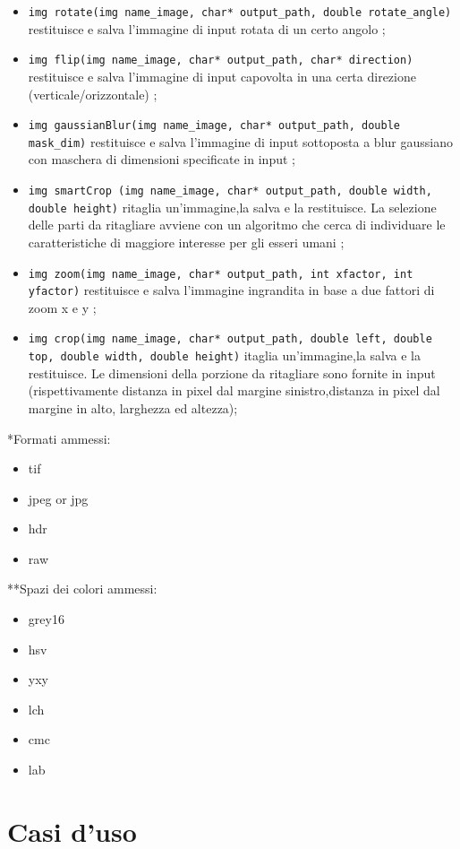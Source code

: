 \documentclass[10pt]{article}
\begin{document}
\begin{itemize}
\item \texttt{img rotate(img name\_image, char* output\_path, double rotate\_angle)} restituisce e salva l’immagine di input rotata di un certo angolo ;
\item \texttt{img flip(img name\_image, char* output\_path, char* direction)} restituisce e salva l’immagine di input capovolta in una certa direzione (verticale/orizzontale) ;
\item \texttt{img gaussianBlur(img name\_image, char* output\_path, double mask\_dim)} restituisce e salva l’immagine di input sottoposta a blur gaussiano con maschera di dimensioni specificate in input ;
\item \texttt{img smartCrop (img name\_image, char* output\_path, double width, double height)} ritaglia un’immagine,la salva e la restituisce. La selezione delle parti da ritagliare avviene con un algoritmo che cerca di individuare le caratteristiche di maggiore interesse per gli esseri umani ;
\item \texttt{img zoom(img name\_image, char* output\_path, int xfactor, int yfactor)} restituisce e salva l’immagine ingrandita in base a due fattori di zoom x e y ;
\item \texttt{img crop(img name\_image, char* output\_path, double left, double top, double width, double height)} itaglia un’immagine,la salva e la restituisce. Le dimensioni della porzione da ritagliare sono fornite in input (rispettivamente distanza in pixel dal margine sinistro,distanza in pixel dal margine in alto, larghezza ed altezza);
\end{itemize}

*Formati ammessi:
\begin{itemize}
	\item tif
	\item jpeg or jpg
	\item hdr
	\item raw
	\label{itm:formats}
\end{itemize}

**Spazi dei colori ammessi:
\begin{itemize}
	\item grey16
	\item hsv
	\item yxy
	\item lch
	\item cmc
	\item lab
\end{itemize}
\clearpage
\section{Casi d'uso}
\end{document}
